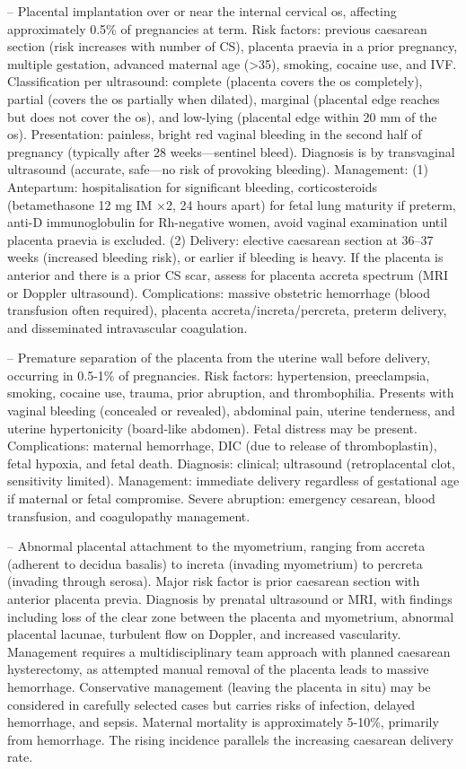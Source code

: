 -- Placental implantation over or near the internal cervical os, affecting approximately 0.5\% of pregnancies at term. Risk factors: previous caesarean section (risk increases with number of CS), placenta praevia in a prior pregnancy, multiple gestation, advanced maternal age (>35), smoking, cocaine use, and IVF. Classification per ultrasound: complete (placenta covers the os completely), partial (covers the os partially when dilated), marginal (placental edge reaches but does not cover the os), and low-lying (placental edge within 20 mm of the os). Presentation: painless, bright red vaginal bleeding in the second half of pregnancy (typically after 28 weeks—sentinel bleed). Diagnosis is by transvaginal ultrasound (accurate, safe—no risk of provoking bleeding). Management: (1) Antepartum: hospitalisation for significant bleeding, corticosteroids (betamethasone 12 mg IM \(\times\)2, 24 hours apart) for fetal lung maturity if preterm, anti-D immunoglobulin for Rh-negative women, avoid vaginal examination until placenta praevia is excluded. (2) Delivery: elective caesarean section at 36--37 weeks (increased bleeding risk), or earlier if bleeding is heavy. If the placenta is anterior and there is a prior CS scar, assess for placenta accreta spectrum (MRI or Doppler ultrasound). Complications: massive obstetric hemorrhage (blood transfusion often required), placenta accreta/increta/percreta, preterm delivery, and disseminated intravascular coagulation.

-- Premature separation of the placenta from the uterine wall before delivery, occurring in 0.5-1\% of pregnancies. Risk factors: hypertension, preeclampsia, smoking, cocaine use, trauma, prior abruption, and thrombophilia. Presents with vaginal bleeding (concealed or revealed), abdominal pain, uterine tenderness, and uterine hypertonicity (board-like abdomen). Fetal distress may be present. Complications: maternal hemorrhage, DIC (due to release of thromboplastin), fetal hypoxia, and fetal death. Diagnosis: clinical; ultrasound (retroplacental clot, sensitivity limited). Management: immediate delivery regardless of gestational age if maternal or fetal compromise. Severe abruption: emergency cesarean, blood transfusion, and coagulopathy management.

-- Abnormal placental attachment to the myometrium, ranging from accreta (adherent to decidua basalis) to increta (invading myometrium) to percreta (invading through serosa). Major risk factor is prior caesarean section with anterior placenta previa. Diagnosis by prenatal ultrasound or MRI, with findings including loss of the clear zone between the placenta and myometrium, abnormal placental lacunae, turbulent flow on Doppler, and increased vascularity. Management requires a multidisciplinary team approach with planned caesarean hysterectomy, as attempted manual removal of the placenta leads to massive hemorrhage. Conservative management (leaving the placenta in situ) may be considered in carefully selected cases but carries risks of infection, delayed hemorrhage, and sepsis. Maternal mortality is approximately 5-10\%, primarily from hemorrhage. The rising incidence parallels the increasing caesarean delivery rate.

